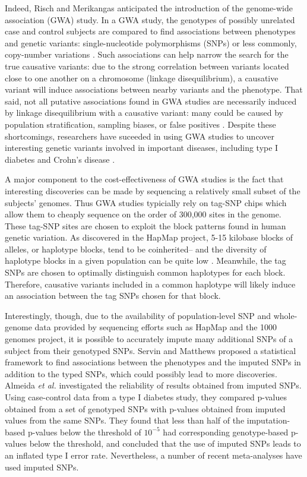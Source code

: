 \documentclass[12pt]{article}
\begin{document}
Indeed, Risch and Merikangas anticipated the introduction of the genome-wide
association (GWA) study.
In a GWA study, the genotypes
 of possibly unrelated case and control subjects
are compared to find associations between
phenotypes and genetic variants: single-nucleotide polymorphisms
(SNPs) or less commonly, copy-number variations \cite{Clarke2011}.
Such associations can help narrow the search for the true causative
variants:
due to the strong correlation between variants located close to one
another on a chromosome (linkage disequilibrium), a causative variant
will induce associations between nearby variants and the
phenotype.
That said, not all putative associations found in GWA studies
are necessarily induced by linkage disequilibrium with a causative variant:
many could be caused by population stratification, sampling biases,
or false positives
\cite{Pearson2008}.
Despite these shortcomings, researchers have suceeded in using GWA
studies
to uncover interesting genetic variants involved in important
diseases, including type I diabetes and Crohn's disease \cite{Visscher2012}.

A major component to the cost-effectiveness of GWA studies is
the fact that interesting discoveries can be made by
sequencing a relatively small subset of the  subjects' genomes.
Thus GWA studies typicially rely on tag-SNP chips which allow them
to cheaply sequence on the order of 300,000 sites in the genome.
These tag-SNP sites are chosen to exploit the block patterns
found in human genetic variation.
As discovered in the HapMap project, 5-15 kilobase blocks
of alleles, or haplotype blocks, tend to be coinherited--
and the diversity of haplotype blocks in a given population
can be quite low \cite{HapMap2007}.
Meanwhile, the tag SNPs are chosen to optimally distinguish common
haplotypes for each block.
Therefore, causative variants included in a common haplotype
will likely induce an association between the tag SNPs chosen
for that block.

Interestingly, though, due to the availability of population-level
SNP and whole-genome data provided by sequencing efforts such as HapMap and
the 1000 genomes project, it is possible to accurately impute many
additional SNPs of a subject from their genotyped SNPs.
Servin and Matthews \cite{Servin2007} proposed a statistical
framework to find associations between the phenotypes and the imputed
SNPs in addition to the typed SNPs, which could possibly lead to more
discoveries.
Almeida \emph{et al.} \cite{Almeida2011} investigated the reliability of
results obtained from imputed SNPs.
Using case-control data from a type I diabetes study, they compared
p-values obtained from a set of genotyped SNPs
with p-values obtained from imputed values from the same SNPs.
They found that less than half of the imputation-based p-values below the
threshold of $10^{-5}$ had corresponding genotype-based
p-values below the threshold, and concluded that the use of imputed
SNPs leads to an inflated type I error rate.
Nevertheless, a number of recent meta-analyses
\cite{Dupuis2010}\cite{Levy2009} have used imputed SNPs.
\end{document}
